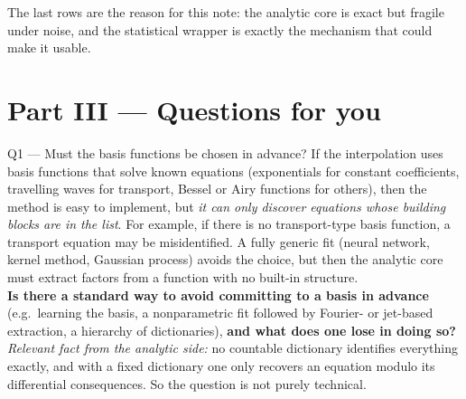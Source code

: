 \documentclass[11pt,a4paper]{article}
\begin{document}
The last rows are the reason for this note: the analytic core is exact but fragile under noise, and the statistical wrapper is exactly the mechanism that could make it usable.

\section*{Part III --- Questions for you}

\begin{askbox}{Q1 --- Must the basis functions be chosen in advance?}
If the interpolation uses basis functions that solve known equations (exponentials for constant coefficients, travelling waves for transport, Bessel or Airy functions for others), then the method is easy to implement, but \emph{it can only discover equations whose building blocks are in the list}. For example, if there is no transport-type basis function, a transport equation may be misidentified. A fully generic fit (neural network, kernel method, Gaussian process) avoids the choice, but then the analytic core must extract factors from a function with no built-in structure.\\[3pt]
\textbf{Is there a standard way to avoid committing to a basis in advance} (e.g.\ learning the basis, a nonparametric fit followed by Fourier- or jet-based extraction, a hierarchy of dictionaries), \textbf{and what does one lose in doing so?}\\[3pt]
\emph{Relevant fact from the analytic side:} no countable dictionary identifies everything exactly, and with a fixed dictionary one only recovers an equation modulo its differential consequences. So the question is not purely technical.
\end{askbox}
\end{document}
